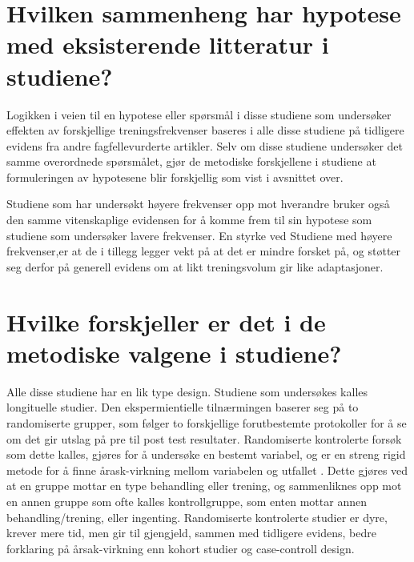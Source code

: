 \documentclass[
]{book}
\begin{document}
\hypertarget{hvilken-sammenheng-har-hypotese-med-eksisterende-litteratur-i-studiene}{%
\section{Hvilken sammenheng har hypotese med eksisterende litteratur i studiene?}\label{hvilken-sammenheng-har-hypotese-med-eksisterende-litteratur-i-studiene}}

Logikken i veien til en hypotese eller spørsmål i disse studiene som undersøker effekten av forskjellige treningsfrekvenser baseres i alle disse studiene på tidligere evidens fra andre fagfellevurderte artikler\citep{brigatto2019, gentil2018, johnsen2021, saric2019, lasevicius2019}. Selv om disse studiene undersøker det samme overordnede spørsmålet, gjør de metodiske forskjellene i studiene at formuleringen av hypotesene blir forskjellig som vist i avsnittet over.

Studiene som har undersøkt høyere frekvenser opp mot hverandre \citep{johnsen2021, saric2019} bruker også den samme vitenskaplige evidensen for å komme frem til sin hypotese som studiene som undersøker lavere frekvenser\citep{brigatto2019, gentil2018, lasevicius2019}. En styrke ved Studiene med høyere frekvenser,er at de i tillegg legger vekt på at det er mindre forsket på, og støtter seg derfor på generell evidens om at likt treningsvolum gir like adaptasjoner\citep{johnsen2021, saric2019}.

\hypertarget{hvilke-forskjeller-er-det-i-de-metodiske-valgene-i-studiene}{%
\section{Hvilke forskjeller er det i de metodiske valgene i studiene?}\label{hvilke-forskjeller-er-det-i-de-metodiske-valgene-i-studiene}}

Alle disse studiene har en lik type design. Studiene som undersøkes kalles longituelle studier. Den ekspermientielle tilnærmingen baserer seg på to randomiserte grupper, som følger to forskjellige forutbestemte protokoller for å se om det gir utslag på pre til post test resultater. Randomiserte kontrolerte forsøk som dette kalles, gjøres for å undersøke en bestemt variabel, og er en streng rigid metode for å finne årask-virkning mellom variabelen og utfallet \citep{sibbald1998}. Dette gjøres ved at en gruppe mottar en type behandling eller trening, og sammenliknes opp mot en annen gruppe som ofte kalles kontrollgruppe, som enten mottar annen behandling/trening, eller ingenting. Randomiserte kontrolerte studier er dyre, krever mere tid, men gir til gjengjeld, sammen med tidligere evidens, bedre forklaring på årsak-virkning enn kohort studier og case-controll design\citep{hulley_2013}.
\end{document}
